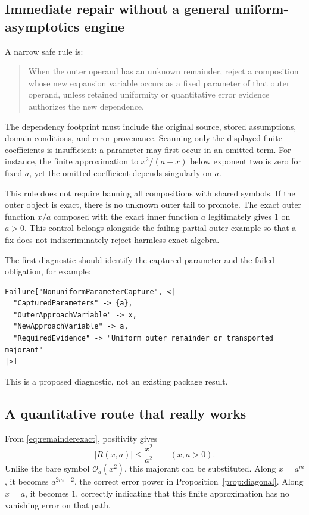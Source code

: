 \documentclass[11pt,letterpaper]{article}
\newcommand{\OO}{\mathcal O}
\begin{document}
\subsection{Immediate repair without a general uniform-asymptotics engine}
A narrow safe rule is:
\begin{quote}
When the outer operand has an unknown remainder, reject a composition whose new expansion variable occurs as a fixed parameter of that outer operand, unless retained uniformity or quantitative error evidence authorizes the new dependence.
\end{quote}
The dependency footprint must include the original source, stored assumptions, domain conditions, and error provenance. Scanning only the displayed finite coefficients is insufficient: a parameter may first occur in an omitted term. For instance, the finite approximation to $x^2/(a+x)$ below exponent two is zero for fixed $a$, yet the omitted coefficient depends singularly on $a$.

This rule does not require banning all compositions with shared symbols. If the outer object is exact, there is no unknown outer tail to promote. The exact outer function $x/a$ composed with the exact inner function $a$ legitimately gives $1$ on $a>0$. This control belongs alongside the failing partial-outer example so that a fix does not indiscriminately reject harmless exact algebra.

The first diagnostic should identify the captured parameter and the failed obligation, for example:
\begin{lstlisting}
Failure["NonuniformParameterCapture", <|
  "CapturedParameters" -> {a},
  "OuterApproachVariable" -> x,
  "NewApproachVariable" -> a,
  "RequiredEvidence" -> "Uniform outer remainder or transported majorant"
|>]
\end{lstlisting}
This is a proposed diagnostic, not an existing package result.

\subsection{A quantitative route that really works}
From \eqref{eq:remainderexact}, positivity gives
\begin{equation}\label{eq:majorant}
 |R(x,a)|\le \frac{x^2}{a^2}\qquad(x,a>0).
\end{equation}
Unlike the bare symbol $\OO_a(x^2)$, this majorant can be substituted. Along $x=a^m$, it becomes $a^{2m-2}$, the correct error power in Proposition~\ref{prop:diagonal}. Along $x=a$, it becomes $1$, correctly indicating that this finite approximation has no vanishing error on that path.
\end{document}
